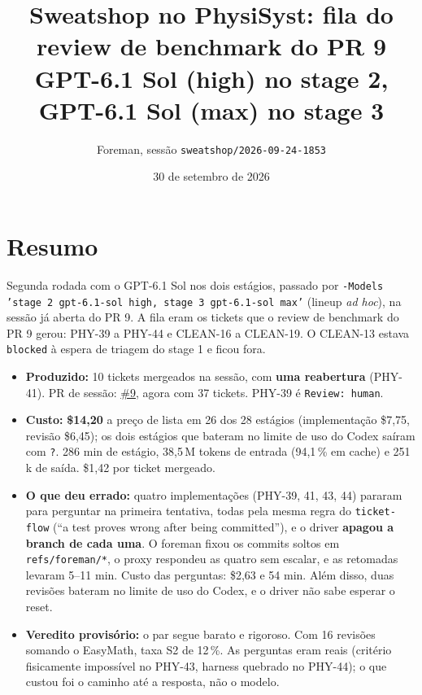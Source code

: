 \documentclass[11pt,a4paper]{article}
\title{Sweatshop no PhysiSyst: fila do review de benchmark do PR 9\\\large GPT-6.1 Sol (high) no stage 2, GPT-6.1 Sol (max) no stage 3}
\author{Foreman, sessão \texttt{sweatshop/2026-09-24-1853}}
\date{30 de setembro de 2026}
\begin{document}
\maketitle

\section*{Resumo}

Segunda rodada com o GPT-6.1 Sol nos dois estágios, passado por
\texttt{-Models 'stage 2 gpt-6.1-sol high, stage 3 gpt-6.1-sol max'}
(lineup \emph{ad hoc}), na sessão já aberta do PR 9. A fila eram os tickets
que o review de benchmark do PR 9 gerou: PHY-39 a PHY-44 e CLEAN-16 a
CLEAN-19. O CLEAN-13 estava \texttt{blocked} à espera de triagem do stage 1 e
ficou fora.

\begin{itemize}
  \item \textbf{Produzido:} 10 tickets mergeados na sessão, com \textbf{uma
        reabertura} (PHY-41). PR de sessão:
        \href{https://github.com/Laginho/PhysiSyst/pull/9}{\#9}, agora com 37
        tickets. PHY-39 é \texttt{Review: human}.
  \item \textbf{Custo:} \textbf{\$14,20} a preço de lista em 26 dos 28
        estágios (implementação \$7,75, revisão \$6,45); os dois estágios que
        bateram no limite de uso do Codex saíram com \texttt{?}. 286 min de
        estágio, 38,5\,M tokens de entrada (94,1\,\% em cache) e 251\,k de
        saída. \$1,42 por ticket mergeado.
  \item \textbf{O que deu errado:} quatro implementações (PHY-39, 41, 43, 44)
        pararam para perguntar na primeira tentativa, todas pela mesma regra do
        \texttt{ticket-flow} (``a test proves wrong after being committed''), e
        o driver \textbf{apagou a branch de cada uma}. O foreman fixou os
        commits soltos em \texttt{refs/foreman/*}, o proxy respondeu as quatro
        sem escalar, e as retomadas levaram 5--11 min. Custo das perguntas:
        \$2,63 e 54 min. Além disso, duas revisões bateram no limite de uso do
        Codex, e o driver não sabe esperar o reset.
  \item \textbf{Veredito provisório:} o par segue barato e rigoroso. Com 16
        revisões somando o EasyMath, taxa S2 de 12\,\%. As perguntas
        eram reais (critério fisicamente impossível no PHY-43, harness quebrado
        no PHY-44); o que custou foi o caminho até a resposta, não o modelo.
\end{itemize}
\end{document}
